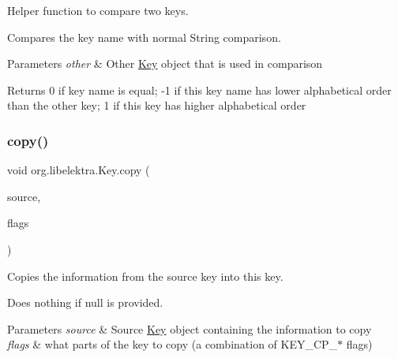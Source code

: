 Helper function to compare two keys. 

Compares the key name with normal String comparison.


\begin{DoxyParams}{Parameters}
{\em other} & Other \hyperlink{classorg_1_1libelektra_1_1Key}{Key} object that is used in comparison \\
\hline
\end{DoxyParams}
\begin{DoxyReturn}{Returns}
0 if key name is equal; -\/1 if this key name has lower alphabetical order than the other key; 1 if this key has higher alphabetical order 
\end{DoxyReturn}
\mbox{\label{classorg_1_1libelektra_1_1Key_a20c230c5edb3f53fe3a7059268aee5ab}} 
\subsubsection{\texorpdfstring{copy()}{copy()}}
{\footnotesize\ttfamily void org.\+libelektra.\+Key.\+copy (\begin{DoxyParamCaption}\item[{final \hyperlink{classorg_1_1libelektra_1_1Key}{Key}}]{source,  }\item[{final int}]{flags }\end{DoxyParamCaption})\hspace{0.3cm}{\ttfamily [inline]}}



Copies the information from the source key into this key. 

Does nothing if null is provided.


\begin{DoxyParams}{Parameters}
{\em source} & Source \hyperlink{classorg_1_1libelektra_1_1Key}{Key} object containing the information to copy \\
\hline
{\em flags} & what parts of the key to copy (a combination of K\+E\+Y\+\_\+\+C\+P\+\_\+$\ast$ flags) \\
\hline
\end{DoxyParams}
\mbox{\label{classorg_1_1libelektra_1_1Key_a9483ae832c9c16e4d68ed1c26babe2ce}} 
